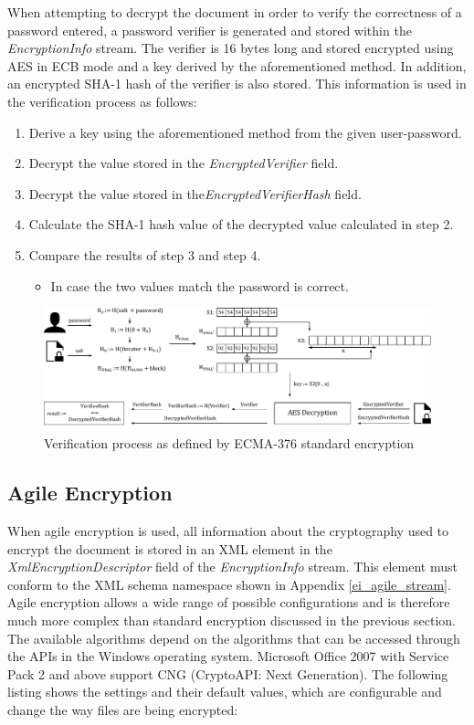 \documentclass[11pt,oneside]{fithesis2}
\begin{document}
When attempting to decrypt the document in order to verify the correctness of a password entered, a password verifier is generated and stored within the \textit{EncryptionInfo} stream. The verifier is 16 bytes long and stored encrypted using AES in ECB mode and a key derived by the aforementioned method. In addition, an encrypted SHA-1 hash of the verifier is also stored. This information is used in the verification process as follows:

\begin{enumerate}
\setlength\itemsep{0.1em}
\item{Derive a key using the aforementioned method from the given user-password.}
\item{Decrypt the value stored in the \textit{EncryptedVerifier} field.}
\item{Decrypt the value stored in the\textit{EncryptedVerifierHash} field.}
\item{Calculate the SHA-1 hash value of the decrypted value calculated in step 2.}
\item{Compare the results of step 3 and step 4. 
	\begin{itemize}
		\item{In case the two values match the password is correct.}
	\end{itemize}}
\end{enumerate}

\begin{figure}[ht]
	\centering
	\includegraphics[width=1\textwidth]{figures/standard_encryption_scheme.pdf}
	\caption{Verification process as defined by ECMA-376 standard encryption}
	\label{standard_encryption_scheme}
\end{figure}

\subsection{Agile Encryption}

When agile encryption is used, all information about the cryptography used to encrypt the document is stored in an XML element in the \textit{XmlEncryptionDescriptor} field of the \textit{EncryptionInfo} stream. This element must conform to the XML schema namespace shown in Appendix \ref{ei_agile_stream}. Agile encryption allows a wide range of possible configurations and is therefore much more complex than standard encryption discussed in the previous section. The available algorithms depend on the algorithms that can be accessed through the APIs in the Windows operating system. Microsoft Office 2007 with Service Pack 2 and above support CNG (CryptoAPI: Next Generation). The following listing shows the settings and their default values, which are configurable and change the way files are being encrypted:
\end{document}
